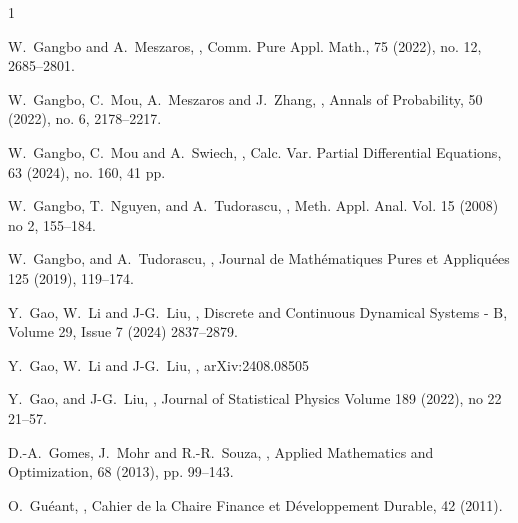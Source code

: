 \documentclass[10pt]{article}
\numberwithin{equation}{section}
\begin{document}
\begin{thebibliography}{1}
{
W.~Gangbo and A.~Meszaros,
,
\newblock Comm. Pure Appl. Math., 75 (2022), no. 12, 2685--2801.



W.~Gangbo, C.~Mou, A.~Meszaros and J.~Zhang,
,
\newblock Annals of Probability, 50 (2022), no. 6, 2178--2217.

W.~Gangbo, C.~Mou and A.~Swiech,
,
\newblock Calc. Var. Partial Differential Equations, 63 (2024), no. 160, 41 pp.


 W.~Gangbo, T.~Nguyen, and A.~Tudorascu,
, 
\newblock Meth. Appl. Anal. Vol. 15 (2008) no 2, 155--184.


 W.~Gangbo, and A.~Tudorascu, 
, 
\newblock Journal de Math\'ematiques Pures et Appliqu\'ees 125 (2019), 119--174.

 Y.~Gao, W.~Li and J-G.~Liu,  
, 
\newblock Discrete and Continuous Dynamical Systems - B, Volume 29, Issue 7 (2024) 2837--2879.

 Y.~Gao, W.~Li and J-G.~Liu,  
, 
\newblock arXiv:2408.08505

 Y.~Gao, and J-G.~Liu,  
, 
\newblock Journal of Statistical Physics Volume 189 (2022), no 22  21--57.

 D.-A.~Gomes, J.~Mohr and R.-R.~Souza, 
,  
\newblock  Applied Mathematics and Optimization, 68 (2013), pp. 99--143.




 O.~Gu\'eant, 
,  
\newblock  Cahier de la Chaire Finance et D\'eveloppement Durable, 42 (2011). 

}
\end{thebibliography}
\end{document}
